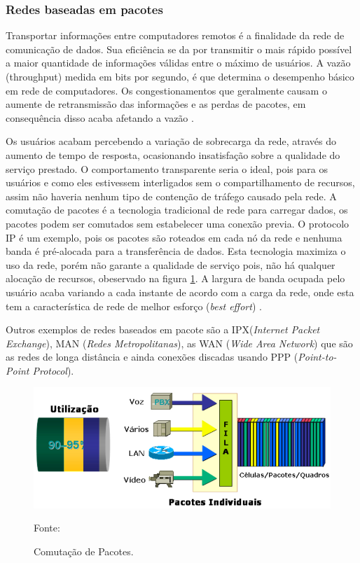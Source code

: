 \subsubsection{Redes baseadas em pacotes}
Transportar informações entre computadores remotos é a finalidade da rede de comunicação de dados. Sua eficiência se da por transmitir o mais rápido possível a maior quantidade de informações válidas entre o máximo de usuários. A vazão (throughput) medida em bits por segundo, é que determina o desempenho básico em rede de computadores. Os congestionamentos que geralmente causam o aumente de retransmissão das informações e as perdas de pacotes, em consequência disso acaba afetando a vazão \cite{davidson2008}.

Os usuários acabam percebendo a variação de sobrecarga da rede, através do aumento de tempo de resposta, ocasionando insatisfação sobre a qualidade do serviço prestado. O comportamento transparente seria o ideal, pois para os usuários e como eles estivessem interligados sem o compartilhamento de recursos, assim não haveria nenhum tipo de contenção de tráfego causado pela rede. A comutação de pacotes é a tecnologia tradicional de rede para carregar dados, os pacotes podem ser comutados sem estabelecer uma conexão previa. O protocolo IP é um exemplo, pois os pacotes são roteados em cada nó da rede e nenhuma banda é pré-alocada para a transferência de dados. Esta tecnologia maximiza o uso da rede, porém não garante a qualidade de serviço pois, não há qualquer alocação de recursos, obeservado na figura \ref{Figura8}. A largura de banda ocupada pelo usuário acaba variando a cada instante de acordo com a carga da rede, onde esta tem a característica de rede de melhor esforço (\textit{best
effort}) \cite{adrianoramosgoncalves2001}.

Outros exemplos de redes baseados em pacote são a IPX(\textit{Internet Packet Exchange}), MAN (\textit{Redes Metropolitanas}), as WAN (\textit{Wide Area Network}) que são as redes de longa distância e ainda conexões discadas usando PPP (\textit{Point-to-Point Protocol}).

\begin{figure}[h]
	\centering
	\includegraphics[width=16.0cm]{imagens/comutacaoPacotes1.jpg}
	\caption{Comutação de Pacotes.}
    \label{Figura8}
    Fonte: \cite{eduardomaronasmonks2006}
\end{figure}

